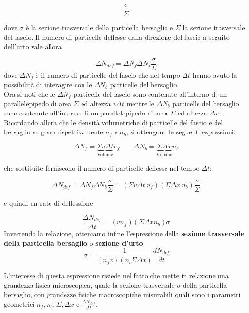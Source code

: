 \[
	\frac{\sigma}{\Sigma}
\]

dove \(\sigma\) è la sezione trasversale della particella bersaglio e
\(\Sigma\) la sezione trasversale del fascio. Il numero di particelle
deflesse dalla direzione del fascio a seguito dell'urto vale allora

\[
	\Delta N_{def} = \Delta N_f \Delta N_b \frac{\sigma}{\Sigma}
\]dove \(\Delta N_f\) è il numero di particelle del fascio che nel tempo
\(\Delta t\) hanno avuto la possibilità di interagire con le
\(\Delta N_b\) particelle del bersaglio.\\
Ora si noti che le \(\Delta N_f\) particelle del fascio sono contenute
all'interno di un parallelepipedo di area \(\Sigma\) ed altezza
\(v \Delta t\) mentre le \(\Delta N_b\) particelle del bersaglio sono
contenute all'interno di un parallelepipedo di area \(\Sigma\) ed
altezza \(\Delta x\) \textbf{.} Ricordando allora che le densità
volumetriche di particelle del fascio e del bersaglio valgono
rispettivamente \(n_f\) e \(n_b\), si ottengono le seguenti espressioni:

\[
	\Delta N_f = \underbrace{\Sigma v \Delta t}_{ \text{Volume}}n_f
	\qquad
	\Delta N_b = \underbrace{\Sigma  \Delta x}_{ \text{Volume}}n_b
\]

che sostituite forniscono il numero di particelle deflesse nel tempo
\(\Delta t\):

\[
	\Delta N_{def} = \Delta N_f \Delta N_b \frac{\sigma}{\Sigma} =
	(\Sigma v \Delta t \ n_f)(\Sigma \Delta x \ n_b)\frac{\sigma}{\Sigma}
\]

e quindi un rate di deflessione

\[
	\frac{\Delta N_{def}}{\Delta t} = (v n_f)( \Sigma \Delta x n_b) \sigma
\] Invertendo la relazione, otteniamo infine l'espressione della
\textbf{sezione trasversale della particella bersaglio} o
\textbf{sezione d'urto}
\begin{equation}
	\boxed{\  \sigma = \frac{1}{(n_fv)(n_b \Sigma \Delta x)}\frac{dN_{def}}{dt} }
\end{equation}

L'interesse di questa espressione risiede nel fatto che mette in
relazione una grandezza fisica microscopica, quale la sezione
trasversale \(\sigma\) della particella bersaglio, con grandezze fisiche
macroscopiche misurabili quali sono i parametri geometrici
\(n_f,n_b,\Sigma,\Delta x\) e \(\frac{\Delta N_{def}}{\Delta t}\).

